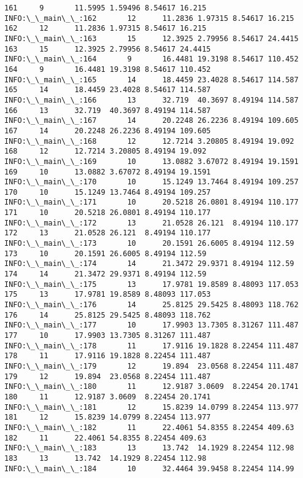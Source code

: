 \documentclass[11pt]{article}
\begin{document}
\begin{Verbatim}[commandchars=\\\{\}]
161     9       11.5995 1.59496 8.54617 16.215
INFO:\_\_main\_\_:162       12      11.2836 1.97315 8.54617 16.215
162     12      11.2836 1.97315 8.54617 16.215
INFO:\_\_main\_\_:163       15      12.3925 2.79956 8.54617 24.4415
163     15      12.3925 2.79956 8.54617 24.4415
INFO:\_\_main\_\_:164       9       16.4481 19.3198 8.54617 110.452
164     9       16.4481 19.3198 8.54617 110.452
INFO:\_\_main\_\_:165       14      18.4459 23.4028 8.54617 114.587
165     14      18.4459 23.4028 8.54617 114.587
INFO:\_\_main\_\_:166       13      32.719  40.3697 8.49194 114.587
166     13      32.719  40.3697 8.49194 114.587
INFO:\_\_main\_\_:167       14      20.2248 26.2236 8.49194 109.605
167     14      20.2248 26.2236 8.49194 109.605
INFO:\_\_main\_\_:168       12      12.7214 3.20805 8.49194 19.092
168     12      12.7214 3.20805 8.49194 19.092
INFO:\_\_main\_\_:169       10      13.0882 3.67072 8.49194 19.1591
169     10      13.0882 3.67072 8.49194 19.1591
INFO:\_\_main\_\_:170       10      15.1249 13.7464 8.49194 109.257
170     10      15.1249 13.7464 8.49194 109.257
INFO:\_\_main\_\_:171       10      20.5218 26.0801 8.49194 110.177
171     10      20.5218 26.0801 8.49194 110.177
INFO:\_\_main\_\_:172       13      21.0528 26.121  8.49194 110.177
172     13      21.0528 26.121  8.49194 110.177
INFO:\_\_main\_\_:173       10      20.1591 26.6005 8.49194 112.59
173     10      20.1591 26.6005 8.49194 112.59
INFO:\_\_main\_\_:174       14      21.3472 29.9371 8.49194 112.59
174     14      21.3472 29.9371 8.49194 112.59
INFO:\_\_main\_\_:175       13      17.9781 19.8589 8.48093 117.053
175     13      17.9781 19.8589 8.48093 117.053
INFO:\_\_main\_\_:176       14      25.8125 29.5425 8.48093 118.762
176     14      25.8125 29.5425 8.48093 118.762
INFO:\_\_main\_\_:177       10      17.9903 13.7305 8.31267 111.487
177     10      17.9903 13.7305 8.31267 111.487
INFO:\_\_main\_\_:178       11      17.9116 19.1828 8.22454 111.487
178     11      17.9116 19.1828 8.22454 111.487
INFO:\_\_main\_\_:179       12      19.894  23.0568 8.22454 111.487
179     12      19.894  23.0568 8.22454 111.487
INFO:\_\_main\_\_:180       11      12.9187 3.0609  8.22454 20.1741
180     11      12.9187 3.0609  8.22454 20.1741
INFO:\_\_main\_\_:181       12      15.8239 14.0799 8.22454 113.977
181     12      15.8239 14.0799 8.22454 113.977
INFO:\_\_main\_\_:182       11      22.4061 54.8355 8.22454 409.63
182     11      22.4061 54.8355 8.22454 409.63
INFO:\_\_main\_\_:183       13      13.742  14.1929 8.22454 112.98
183     13      13.742  14.1929 8.22454 112.98
INFO:\_\_main\_\_:184       10      32.4464 39.9458 8.22454 114.99

\end{Verbatim}
\end{document}
